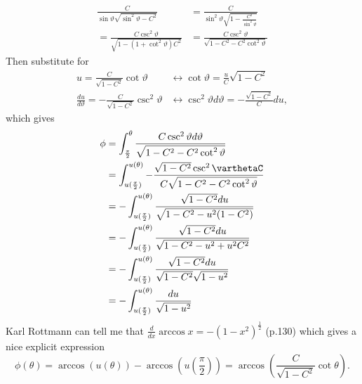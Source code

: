 \documentclass[11pt]{amsart}
\begin{document}
\begin{align*}
\frac{C}{\sin\vartheta\sqrt{\sin^2\vartheta-C^2}} &= \frac{C}{\sin^2\vartheta\sqrt{1 - \frac{C^2}{\sin^2\vartheta}}} \\
= \frac{C\csc^2\vartheta}{\sqrt{1-(1+\cot^2\vartheta)C^2}} &= \frac{C\csc^2\vartheta}{\sqrt{1-C^2-C^2\cot^2\vartheta}}
\end{align*}
Then substitute for
\begin{align*}
u = \frac{C}{\sqrt{1-C^2}}\cot\vartheta &\leftrightarrow \cot\vartheta = \frac{u}{C}\sqrt{1-C^2} \\
\frac{du}{d\vartheta} = -\frac{C}{\sqrt{1-C^2}}\csc^2\vartheta &\leftrightarrow \csc^2\vartheta d\vartheta = -\frac{\sqrt{1-C^2}}{C}du,
\end{align*}
which gives
\begin{align*}
\phi &= \int_{\frac{\pi}{2}}^{\theta} \frac{C\csc^2\vartheta d\vartheta}{\sqrt{1-C^2-C^2\cot^2\vartheta}} \\
	&= \int_{u(\frac{\pi}{2})}^{u(\theta)} -\frac{\sqrt{1-C^2} \csc^2\varthetaC}{C\sqrt{1-C^2-C^2\cot^2\vartheta}} \\
	&= -\int_{u(\frac{\pi}{2})}^{u(\theta)} \frac{\sqrt{1-C^2}du}{\sqrt{1-C^2 - u^2(1-C^2)}} \\
	&= -\int_{u(\frac{\pi}{2})}^{u(\theta)} \frac{\sqrt{1-C^2} du}{\sqrt{1-C^2-u^2+u^2C^2}} \\
	&= -\int_{u(\frac{\pi}{2})}^{u(\theta)} \frac{\sqrt{1-C^2} du}{\sqrt{1-C^2}\sqrt{1-u^2}}\\
	&= -\int_{u(\frac{\pi}{2})}^{u(\theta)} \frac{du}{\sqrt{1-u^2}}	
\end{align*}
Karl Rottmann can tell me that $\frac{d}{dx}\arccos x = -(1-x^2)^{\frac{1}{2}}$ (p.130) which gives a nice explicit expression
\begin{equation}
\phi(\theta) = \arccos(u(\theta)) - \arccos(u(\frac{\pi}{2})) = \arccos(\frac{C}{\sqrt{1-C^2}}\cot\theta).
\end{equation}
\end{document}
